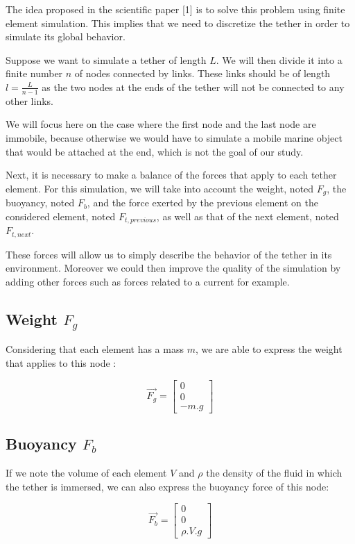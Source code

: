 The idea proposed in the scientific paper [1] is to solve this problem using finite element simulation. This implies that we need to discretize the tether in order to simulate its global behavior.

Suppose we want to simulate a tether of length $L$. We will then divide it into a finite number $n$ of nodes connected by links. These links should be of length $l=\frac{L}{n-1}$ as the two nodes at the ends of the tether will not be connected to any other links.

We will focus here on the case where the first node and the last node are immobile, because otherwise we would have to simulate a mobile marine object that would be attached at the end, which is not the goal of our study.

Next, it is necessary to make a balance of the forces that apply to each tether element. For this simulation, we will take into account the weight, noted $F_g$, the buoyancy, noted $F_b$, and the force exerted by the previous element on the considered element, noted $F_{t, previous}$, as well as that of the next element, noted $F_{t, next}$.

These forces will allow us to simply describe the behavior of the tether in its environment. Moreover we could then improve the quality of the simulation by adding other forces such as forces related to a current for example.

\subsection{Weight $F_g$}
Considering that each element has a mass $m$, we are able to express the weight that applies to this node :

$$\overrightarrow{F_g} = \begin{bmatrix}0\\ 0\\ -m.g\end{bmatrix}$$

\subsection{Buoyancy $F_b$}
If we note the volume of each element $V$ and $\rho$ the density of the fluid in which the tether is immersed, we can also express the buoyancy force of this node:

$$\overrightarrow{F_b} = \begin{bmatrix}0\\ 0\\ \rho.V.g\end{bmatrix}$$


